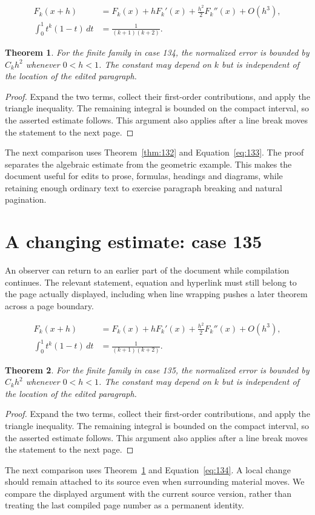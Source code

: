 \documentclass[a4paper,10pt]{article}
\newtheorem{theorem}{Theorem}[section]
\begin{document}
\lipsum[10-11]
\begin{align}\label{eq:133}
 F_k(x+h)&=F_k(x)+hF_k'(x)+\frac{h^2}{2}F_k''(x)+O(h^3),\\
 \int_0^1 t^k(1-t)\,dt&=\frac{1}{(k+1)(k+2)}.
\end{align}
\begin{theorem}\label{thm:133}
For the finite family in case 134, the normalized error is bounded by $C_k h^2$ whenever $0<h<1$. The constant may depend on $k$ but is independent of the location of the edited paragraph.
\end{theorem}
\begin{proof}
Expand the two terms, collect their first-order contributions, and apply the
triangle inequality. The remaining integral is bounded on the compact interval,
so the asserted estimate follows. This argument also applies after a line break
moves the statement to the next page.
\end{proof}
The next comparison uses Theorem~\ref{thm:132} and Equation~\ref{eq:133}. The proof separates the algebraic estimate from the geometric example. This makes the document useful for edits to prose, formulas, headings and diagrams, while retaining enough ordinary text to exercise paragraph breaking and natural pagination.

\lipsum[18]

\section{A changing estimate: case 135}\label{unit:134}
An observer can return to an earlier part of the document while compilation continues. The relevant statement, equation and hyperlink must still belong to the page actually displayed, including when line wrapping pushes a later theorem across a page boundary.

\lipsum[13-14]
\begin{align}\label{eq:134}
 F_k(x+h)&=F_k(x)+hF_k'(x)+\frac{h^2}{2}F_k''(x)+O(h^3),\\
 \int_0^1 t^k(1-t)\,dt&=\frac{1}{(k+1)(k+2)}.
\end{align}
\begin{theorem}\label{thm:134}
For the finite family in case 135, the normalized error is bounded by $C_k h^2$ whenever $0<h<1$. The constant may depend on $k$ but is independent of the location of the edited paragraph.
\end{theorem}
\begin{proof}
Expand the two terms, collect their first-order contributions, and apply the
triangle inequality. The remaining integral is bounded on the compact interval,
so the asserted estimate follows. This argument also applies after a line break
moves the statement to the next page.
\end{proof}
The next comparison uses Theorem~\ref{thm:133} and Equation~\ref{eq:134}. A local change should remain attached to its source even when surrounding material moves. We compare the displayed argument with the current source version, rather than treating the last compiled page number as a permanent identity.
\end{document}
